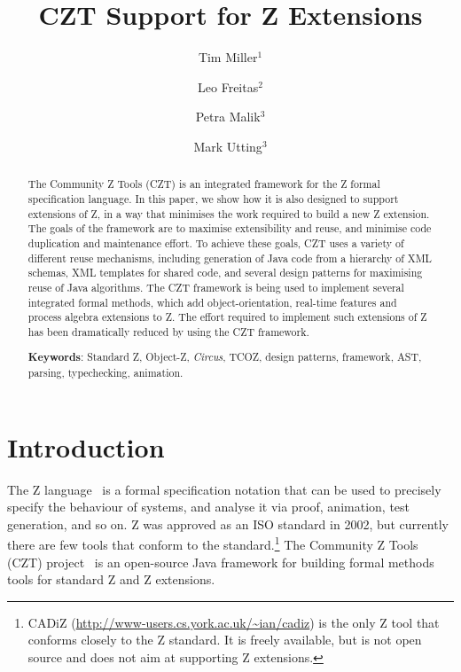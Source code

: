 \documentclass{llncs}
\newcommand{\Circus}{{\sf\slshape Circus}}
\begin{document}
\title{CZT Support for Z Extensions}
\author{Tim Miller$^1$ \and Leo Freitas$^2$ \and Petra Malik$^3$ \and Mark Utting$^3$}


\maketitle


\begin{abstract}
  The Community Z Tools (CZT) is an integrated
  framework for the Z formal specification language.  In this
  paper, we show how it is also designed to support extensions
  of Z, in a way that minimises the work required to build a
  new Z extension.  The goals of the framework are to maximise
  extensibility and reuse, and minimise code duplication and
  maintenance effort.  To achieve these goals, CZT uses a variety of
  different reuse mechanisms, including generation of Java
  code from a hierarchy of XML schemas, XML templates for shared
  code, and several design patterns for maximising reuse of Java
  algorithms.
  The CZT framework is being used to implement several integrated
  formal methods, which add object-orientation, real-time features
  and process algebra extensions to Z.  The effort required to
  implement such extensions of Z has been dramatically reduced
  by using the CZT framework.

  \noindent
  \textbf{Keywords}: Standard Z, Object-Z, \Circus, TCOZ, design patterns,
     framework, AST, parsing, typechecking, animation.
\end{abstract}

\section{Introduction} \label{sec:intro}

  The Z language~\cite{isoz} is a formal specification notation that
  can be used to precisely specify the behaviour of systems, and
  analyse it via proof, animation, test generation, and so on.
  Z was approved as an ISO standard in 2002, but currently there are few
  tools that conform to the standard.\footnote{CADiZ
  (\url{http://www-users.cs.york.ac.uk/~ian/cadiz}) is the only Z tool
  that conforms closely to the Z standard.  It is freely available,
  but is not open source and does not aim at supporting Z extensions.}
  The Community Z Tools (CZT) project~\cite{czt} is an open-source Java
  framework for building formal methods tools for standard Z and Z extensions.
\end{document}
